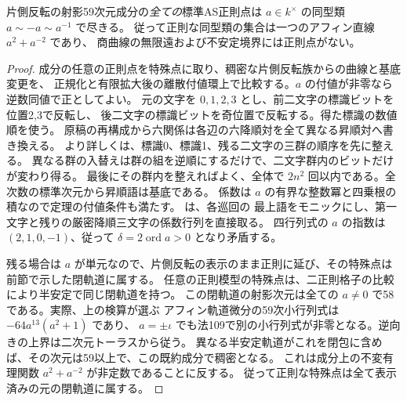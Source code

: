 \begin{theorem}\label{thm:all-mixed-flip-component-regular}
片側反転の射影59次元成分の\emph{全ての}標準AS正則点は
$a\in k^\times$ の同型類 $a\sim -a\sim a^{-1}$ で尽きる。
従って正則な同型類の集合は一つのアフィン直線 $a^2+a^{-2}$ であり、
商曲線の無限遠および不安定境界には正則点がない。
\end{theorem}
\begin{proof}
成分の任意の正則点を特殊点に取り、稠密な片側反転族からの曲線と基底変更を、
正規化と有限拡大後の離散付値環上で比較する。$a$ の付値が非零なら逆数同値で正としてよい。
元の文字を $0,1,2,3$ とし、前二文字の標識ビットを位置2,3で反転し、
後二文字の標識ビットを奇位置で反転する。得た標識の数値順を使う。
原稿の再構成から六関係は各辺の六降順対を全て異なる昇順対へ書き換える。
より詳しくは、標識0、標識1、残る二文字の三群の順序を先に整える。
異なる群の入替えは群の組を逆順にするだけで、二文字群内のビットだけが変わり得る。
最後にその群内を整えればよく、全体で $2n^2$ 回以内である。全次数の標準次元から昇順語は基底である。
係数は $a$ の有界な整数冪と四乗根の積なので定理の付値条件も満たす。
 は、各巡回の
最上語をモニックにし、第一文字と残りの厳密降順三文字の係数行列を直接取る。
四行列式の $a$ の指数は $(2,1,0,-1)$、従って $\delta=2\operatorname{ord}a>0$ となり矛盾する。

残る場合は $a$ が単元なので、片側反転の表示のまま正則に延び、その特殊点は前節で示した閉軌道に属する。
任意の正則模型の特殊点は、二正則格子の比較により半安定で同じ閉軌道を持つ。
この閉軌道の射影次元は全ての $a\ne0$ で58である。実際、上の検算が選ぶ
アフィン軌道微分の59次小行列式は $-64a^{13}(a^2+1)$ であり、
$a=\pm\iota$ でも法109で別の小行列式が非零となる。逆向きの上界は二次元トーラスから従う。
異なる半安定軌道がこれを閉包に含めば、その次元は59以上で、この既約成分で稠密となる。
これは成分上の不変有理関数 $a^2+a^{-2}$ が非定数であることに反する。
従って正則な特殊点は全て表示済みの元の閉軌道に属する。
\end{proof}
